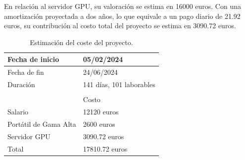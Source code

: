En relación al servidor GPU, su valoración se estima en 16000 euros. Con una amortización proyectada a dos años, lo que equivale a un pago diario de 21.92 euros, su contribución al costo total del proyecto se estima en 3090.72 euros.


\begin{table}[H]
	\centering
	\begin{tabular}{ll}
	\hline
	\multicolumn{1}{|l|}{\cellcolor[HTML]{FFCB2F}Fecha de inicio} & \multicolumn{1}{l|}{05/02/2024} \\ \hline
	\multicolumn{1}{|l|}{\cellcolor[HTML]{FFCB2F}Fecha de fin} & \multicolumn{1}{l|}{24/06/2024} \\ \hline
	\multicolumn{1}{|l|}{\cellcolor[HTML]{FFCB2F}Duración} & \multicolumn{1}{l|}{141 días, 101 laborables} \\ \hline
	 &  \\ \hline
	\rowcolor[HTML]{FFCB2F} 
	\multicolumn{1}{|l|}{\cellcolor[HTML]{FFCB2F}Item} & \multicolumn{1}{l|}{\cellcolor[HTML]{FFCB2F}Costo} \\ \hline
	\multicolumn{1}{|l|}{Salario} & \multicolumn{1}{l|}{12120 euros} \\ \hline
	\multicolumn{1}{|l|}{Portátil de Gama Alta} & \multicolumn{1}{l|}{2600 euros} \\ \hline
	\multicolumn{1}{|l|}{Servidor GPU} & \multicolumn{1}{l|}{3090.72 euros} \\ \hline
	\multicolumn{1}{|l|}{\cellcolor[HTML]{FFCB2F}Total} & \multicolumn{1}{l|}{17810.72 euros} \\ \hline
	\end{tabular}
	\caption{Estimación del coste del proyecto.}
	\label{tab:coste-proyecto}
\end{table}
